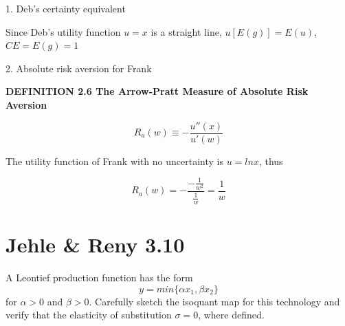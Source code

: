 \documentclass{article}
\begin{document}
1. Deb's certainty equivalent

Since Deb's utility function $u = x$ is a straight line, $u[E(g)] = E(u)$,
$CE =  E(g) = 1$

2. Absolute risk aversion for Frank

\begin{mdframed}[backgroundcolor=blue!20,linecolor=white]
\textbf{DEFINITION 2.6 The Arrow-Pratt Measure of Absolute Risk Aversion}

$$R_a(w) \equiv -\frac{u''(x)}{u'(w)}$$

\end{mdframed}


The utility function of Frank with no uncertainty is $u = ln x$, thus

$$R_a(w) = -\frac{-\frac{1}{w^2}}{\frac{1}{w}}=\frac{1}{w}$$



\newpage

\section{Jehle \& Reny 3.10}

A Leontief production function has the form $$y = min\{\alpha x_1, \beta x_2 \}$$
for $\alpha > 0$ and $\beta > 0$. Carefully sketch the isoquant map for this technology and verify that the
elasticity of substitution $\sigma = 0$, where defined.
\end{document}
